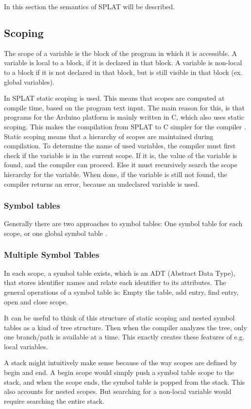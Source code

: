 In this section the semantics of SPLAT will be described. 

\subsection{Scoping}
The scope of a variable is the block of the program in which it is accessible. A variable is local to a block, if it is declared in that block. A variable is non-local to a block if it is not declared in that block, but is still visible in that block (ex. global variables).

In SPLAT static scoping is used. This means that scopes are computed at compile time, based on the program text input. The main reason for this, is that programs for the Arduino platform is mainly written in C, which also uses static scoping. This makes the compilation from SPLAT to C simpler for the compiler \citep{arduinobuild}. Static scoping means that a hierarchy of scopes are maintained during compilation. To determine the name of used variables, the compiler must first check if the variable is in the current scope. If it is, the value of the variable is found, and the compiler can proceed. Else it must recursively search the scope hierarchy for the variable. When done, if the variable is still not found, the compiler returns an error, because an undeclared variable is used.
\subsubsection{Symbol tables}
Generally there are two approaches to symbol tables: One symbol table for each scope, or one global symbol table \citep{sebesta}. 
\subsubsection*{Multiple Symbol Tables}
In each scope, a symbol table exists, which is an ADT (Abstract Data Type), that stores identifier names and relate each identifier to its attributes. The general operations of a symbol table is: Empty the table, add entry, find entry, open and close scope. 

It can be useful to think of this structure of static scoping and nested symbol tables as a kind of tree structure. Then when the compiler analyzes the tree, only one branch/path is available at a time. This exactly creates these features of e.g. local variables.

A stack might intuitively make sense because of the way scopes are defined by begin and end. A begin scope would simply push a symbol table scope to the stack, and when the scope ends, the symbol table is popped from the stack. This also accounts for nested scopes. But searching for a non-local variable would require searching the entire stack. 

